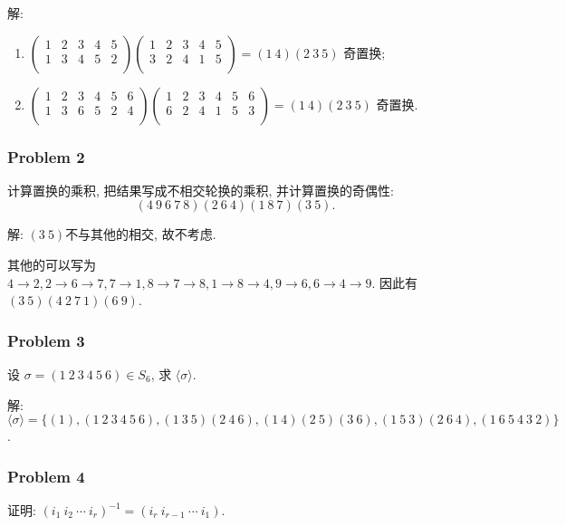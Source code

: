 \documentclass[a4paper,12pt]{ctexart}
\begin{document}
  解: \begin{enumerate}[label=(\arabic{*})]
    \item  $\begin{pmatrix}
      1 &2 &3 &4 &5 \\
      1 &3 &4 &5 &2 \\
    \end{pmatrix}\begin{pmatrix}
      1 &2 &3 &4 &5 \\
      3 &2 &4 &1 &5 \\
    \end{pmatrix}=(1~4)(2~3~5)$ 奇置换;
    \item $\begin{pmatrix}
      1 &2 &3 &4 &5 &6\\
      1 &3 &6 &5 &2 &4\\
    \end{pmatrix}\begin{pmatrix}
      1 &2 &3 &4 &5 &6\\
      6 &2 &4 &1 &5 &3\\
    \end{pmatrix}=(1~4)(2~3~5)$ 奇置换.
  \end{enumerate}
\subsubsection*{Problem 2} 
    计算置换的乘积, 把结果写成不相交轮换的乘积, 并计算置换的奇偶性:
    \[\left(4~9~6~7~8\right)\left(2~6~4\right)\left(1~8~7\right)\left(3~5\right).\]
  
    解: $ (3~5) $不与其他的相交, 故不考虑. 
    
    其他的可以写为 $ 4\rightarrow 2,2\rightarrow 6\rightarrow 7,7\rightarrow 1, 8\rightarrow 7\rightarrow 8,1\rightarrow 8\rightarrow 4,9\rightarrow 6,6\rightarrow 4\rightarrow 9 $.
    因此有 $ (3~5)(4~2~7~1)(6~9) $.

\subsubsection*{Problem 3}
  设 $ \sigma = \left(1~2~3~4~5~6\right)\in S_6 $, 求 $ \langle\sigma\rangle $.

    解: $ \langle \sigma\rangle=\{(1),(1~2~3~4~5~6),(1~3~5)(2~4~6),(1~4)(2~5)(3~6),(1~5~3)(2~6~4),(1~6~5~4~3~2)\} $.

\subsubsection*{Problem 4}
    证明: $ \left(i_1~i_2~\cdots~i_r\right)^{-1}=\left(i_r~i_{r-1}~\cdots~i_1\right) $.
\end{document}
